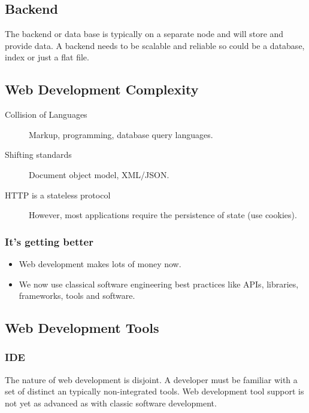 \subsection{Backend}\label{sub:backend}

The backend or data base is typically on a separate node and will store and provide data.
A backend needs to be scalable and reliable so could be a database, index or just a flat file.

\subsection{Web Development Complexity}\label{sub:web_development_complexity}

\begin{description}
    \item[Collision of Languages] Markup, programming, database query languages.
    \item[Shifting standards] Document object model, XML/JSON.
    \item[HTTP is a stateless protocol] However, most applications require the persistence of state (use cookies).
\end{description}

\subsubsection{It's getting better}\label{ssub:it_s_getting_better}

\begin{itemize}
    \item Web development makes lots of money now.
    \item We now use classical software engineering best practices like APIs, libraries, frameworks, tools and software.
\end{itemize}

\subsection{Web Development Tools}\label{sub:web_development_tools}

\subsubsection{IDE}\label{ssub:ide}

The nature of web development is disjoint.
A developer must be familiar with a set of distinct an typically non-integrated tools.
Web development tool support is not yet as advanced as with classic software development.

